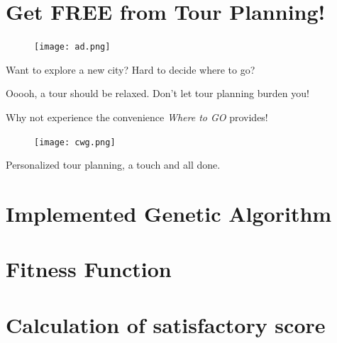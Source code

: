 \documentclass{mcmthesis}
\begin{document}
\section*{Get FREE from Tour Planning!}
  \begin{figure}[h]
    \centering
    \texttt{[image: ad.png]}
  \end{figure}
Want to explore a new city? Hard to decide where to go? \par
Ooooh, a tour should be relaxed. Don't let tour planning burden you! \par
  \centering
Why not experience the convenience \emph{Where to GO} provides!\par
  \begin{figure}[h]
    \centering
    \texttt{[image: cwg.png]}
  \end{figure}
\begin{large}
  Personalized tour planning, a touch and all done.
\end{large}

	

	
\newpage

\begin{appendices}
  \section{Implemented Genetic Algorithm}
  
  \section{Fitness Function}
  
  \section{Calculation of satisfactory score}
  
\end{appendices}
\end{document}
